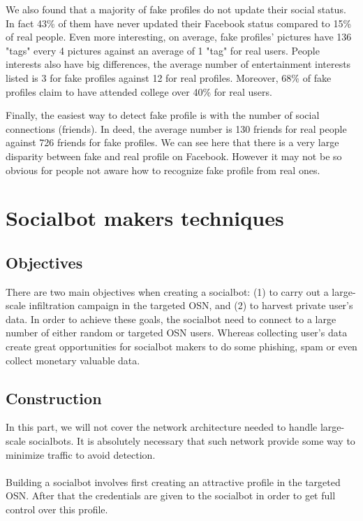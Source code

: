 \documentclass[12pt,a4paper]{article}
\begin{document}
We also found that a majority of fake profiles do not update their social status. In fact 43\%
of them have never updated their Facebook status compared to 15\% of real people. Even more
interesting, on average, fake profiles' pictures have 136 "tags" every 4 pictures against an
average of 1 "tag" for real users. People interests also have big differences, the average
number of entertainment interests listed is 3 for fake profiles against 12 for real profiles.
Moreover, 68\% of fake profiles claim to have attended college over 40\% for real users.

Finally, the easiest way to detect fake profile is with the number of social connections
(friends). In deed, the average number is 130 friends for real people against 726 friends
for fake profiles. We can see here that there is a very large disparity between fake and
real profile on Facebook. However it may not be so obvious for people not aware how to
recognize fake profile from real ones.\cite{facebook_user_profiles}

\section{Socialbot makers techniques}

  \subsection{Objectives}
  There are two main objectives when creating a socialbot: (1) to carry out a large-scale
  infiltration campaign in the targeted OSN, and (2) to harvest private user's data. In order
  to achieve these goals, the socialbot need to connect to a large number of either random or
  targeted OSN users. Whereas collecting user's data create great opportunities for socialbot
  makers to do some phishing, spam or even collect monetary valuable data.

  \subsection{Construction}
  In this part, we will not cover the network architecture needed to handle large-scale
  socialbots. It is absolutely necessary that such network provide some way to minimize
  traffic to avoid detection.\\
  \\
  Building a socialbot involves first creating an attractive profile in the targeted OSN. After
  that the credentials are given to the socialbot in order to get full control over this profile.
\end{document}
